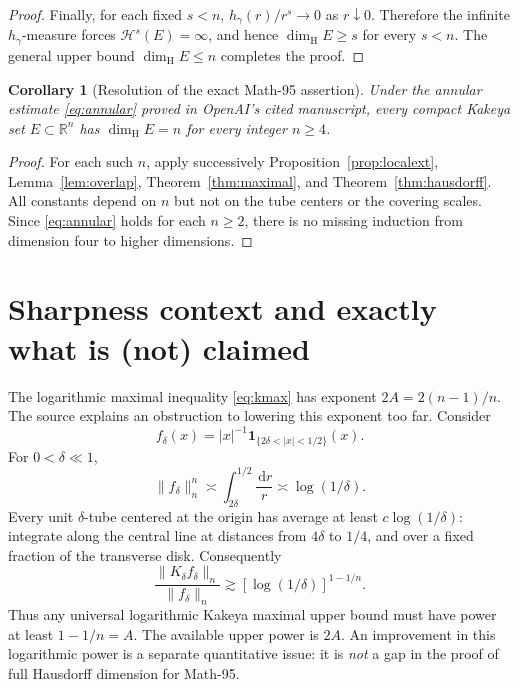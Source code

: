 \documentclass[11pt,a4paper]{article}
\numberwithin{equation}{section}
\newtheorem{corollary}[theorem]{Corollary}
\theoremstyle{definition}
\theoremstyle{remark}
\newcommand{\R}{\mathbb R}
\newcommand{\dd}{\,\mathrm d}
\newcommand{\one}{\mathbf 1}
\newcommand{\Hs}{\mathcal H}
\newcommand{\dimH}{\dim_{\mathrm H}}
\begin{document}
\begin{proof}
Finally, for each fixed $s<n$,
$h_\gamma(r)/r^s\to0$ as $r\downarrow0$.
Therefore the infinite $h_\gamma$-measure forces
$\Hs^s(E)=\infty$, and hence $\dimH E\ge s$ for every $s<n$.
The general upper bound $\dimH E\le n$ completes the proof.
\end{proof}

\begin{corollary}[Resolution of the exact Math-95 assertion]
\label{cor:95}
Under the annular estimate \eqref{eq:annular} proved in OpenAI's
cited manuscript, every compact Kakeya set $E\subset\R^n$ has
$\dimH E=n$ for every integer $n\ge4$.
\end{corollary}
\begin{proof}
For each such $n$, apply successively
Proposition~\ref{prop:localext}, Lemma~\ref{lem:overlap},
Theorem~\ref{thm:maximal}, and Theorem~\ref{thm:hausdorff}.
All constants depend on $n$ but not on the tube centers or the
covering scales. Since \eqref{eq:annular} holds for each $n\ge2$,
there is no missing induction from dimension four to higher
dimensions.
\end{proof}

\section{Sharpness context and exactly what is (not) claimed}
\label{sec:sharpness}
The logarithmic maximal inequality \eqref{eq:kmax} has exponent
$2A=2(n-1)/n$. The source explains an obstruction to lowering this
exponent too far. Consider
\[
 f_\delta(x)=|x|^{-1}\one_{\{2\delta<|x|<1/2\}}(x).
\]
For $0<\delta\ll1$,
\begin{equation}\label{eq:sharpLp}
 \|f_\delta\|_n^n\asymp\int_{2\delta}^{1/2}\frac{\dd r}{r}
         \asymp\log(1/\delta).
\end{equation}
Every unit $\delta$-tube centered at the origin has average at
least $c\log(1/\delta)$: integrate along the central line at
distances from $4\delta$ to $1/4$, and over a fixed fraction of the
transverse disk. Consequently
\[
 \frac{\|K_\delta f_\delta\|_n}{\|f_\delta\|_n}
   \gtrsim[\log(1/\delta)]^{1-1/n}.
\]
Thus any universal logarithmic Kakeya maximal upper bound must have
power at least $1-1/n=A$. The available upper power is $2A$.
An improvement in this logarithmic power is a separate quantitative
issue: it is \emph{not} a gap in the proof of full Hausdorff
dimension for Math-95.
\end{document}
